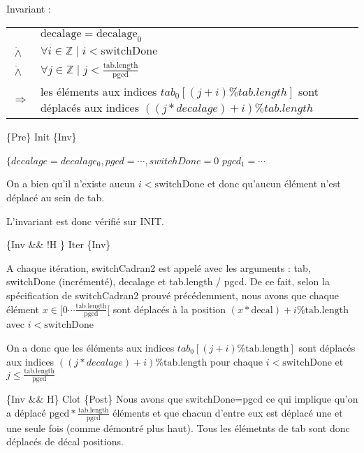 Invariant :

\begin{tabular}{ll}

& $\mathrm{decalage}=\mathrm{decalage}_{0}$ \\
$\dot{\wedge}$ & $\forall i \in \mathbb{Z} \mid i < \mathrm{switchDone} $ \\
$\dot{\wedge}$ & $\forall j \in \mathbb{Z} \mid j < \frac{\mathrm{tab.length}}{\mathrm{pgcd}}$ \\
$\Rightarrow$ & les éléments aux indices $tab_{0}[(j+i) \% tab.length]$ sont déplacés aux indices $((j*decalage)+i) \% tab.length$
\end{tabular}

\{Pre\} Init \{Inv\}

$\{decalage=decalage_{0}, pgcd =\cdots, switchDone=0$
$pgcd_{1} = \cdots$

On a bien qu'il n'existe aucun $i < \mathrm{switchDone}$ et donc
qu'aucun élément n'est déplacé au sein de tab.

L'invariant est donc vérifié sur INIT.

\{Inv \&\& !H \} Iter \{Inv\}

A chaque itération, switchCadran2 est appelé avec les arguments : tab,
switchDone (incrémenté), decalage et tab.length / pgcd. De ce fait,
selon la spécification de switchCadran2 prouvé précédemment, nous avons
que chaque élément $x \in [0\cdots
    \frac{\mathrm{tab.length}}{\mathrm{pgcd}}[$ sont déplacés à la
        position $(x*\mathrm{decal})+i \% \mathrm{tab.length}$ avec $i < \mathrm{switchDone}$

On a donc que les éléments aux indices
$tab_{0}[(j+i)\%\mathrm{tab.length}]$ sont déplacés aux indices
$((j*decalage) + i) \% \mathrm{tab.length}$ pour chaque $i <
\mathrm{switchDone}$
et $j \leq \frac{\mathrm{tab.length}}{\mathrm{pgcd}}$

\{Inv \&\& H\} Clot \{Post\} Nous avons que switchDone=pgcd ce qui implique qu'on a déplacé
$\mathrm{pgcd}*\frac{\mathrm{tab.length}}{\mathrm{pgcd}}$ éléments et
que chacun d'entre eux est déplacé une et une seule fois (comme démontré
plus haut). Tous les élémetnts de tab sont donc déplacés de décal positions.
